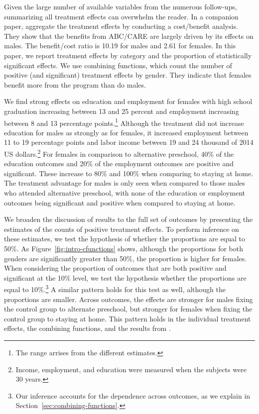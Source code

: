 Given the large number of available variables from the numerous follow-ups, summarizing all treatment effects can overwhelm the reader. In a companion paper, \citet{Garcia_Heckman_Leaf_etal_2017_Comp_CBA_Unpublished} aggregate the treatment effects by conducting a cost/benefit analysis. They show that the benefits from ABC/CARE are largely driven by its effects on males. The benefit/cost ratio is 10.19 for males and 2.61 for females. In this paper, we report treatment effects by category and the proportion of statistically significant effects. We use combining functions, which count the number of positive (and significant) treatment effects by gender. They indicate that females benefit more from the program than do males.

We find strong effects on education and employment for females with high school graduation increasing between 13 and 25 percent and employment increasing between 8 and 13 percentage points.\footnote{The range arrises from the different estimates.} Although the treatment did not increase education for males as strongly as for females, it increased employment between 11 to 19 percentage points and labor income between 19 and 24 thousand of 2014 US dollars.\footnote{Income, employment, and education were measured when the subjects were 30 years.}  For females in comparison to alternative preschool, 40\% of the education outcomes and 20\% of the employment outcomes are positive and significant. These increase to 80\% and 100\% when comparing to staying at home. The treatment advantage for males is only seen when compared to those males who attended alternative preschool, with none of the education or employment outcomes being significant and positive when compared to staying at home. 

We broaden the discussion of results to the full set of outcomes by presenting the estimates of the counts of positive treatment effects. To perform inference on these estimates, we test the hypothesis of whether the proportions are equal to 50\%. As Figure~\ref{fig:intro-cfunctions} shows, although the proportions for both genders are significantly greater than 50\%, the proportion is higher for females. When considering the proportion of outcomes that are both positive and significant at the 10\% level, we test the hypothesis whether the proportions are equal to 10\%.\footnote{Our inference accounts for the dependence across outcomes, as we explain in Section~\ref{sec:combining-functions}.} A similar pattern holds for this test as well, although the proportions are smaller. Across outcomes, the effects are stronger for males fixing the control group to alternate preschool, but stronger for females when fixing the control group to staying at home. This pattern holds in the individual treatment effects, the combining functions, and the results from \citet{Garcia_Heckman_Leaf_etal_2017_Comp_CBA_Unpublished}.

